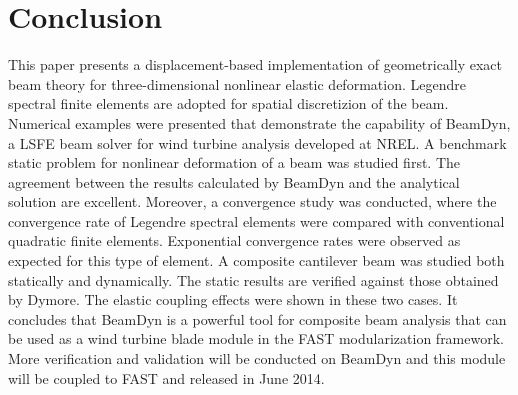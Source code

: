 \section{Conclusion}

This paper presents a displacement-based implementation of geometrically
exact beam theory for three-dimensional nonlinear elastic deformation. Legendre spectral finite elements are adopted for spatial discretizion of
the beam. Numerical examples were presented that demonstrate the capability
of BeamDyn, a LSFE beam solver for wind turbine analysis developed at NREL. A benchmark static problem for nonlinear deformation of a beam was studied first. The agreement between the results calculated by BeamDyn and the analytical solution are excellent. Moreover, a convergence study was conducted, where the convergence rate of Legendre spectral elements were compared with conventional quadratic finite elements. Exponential convergence rates were observed as expected for this type of element. A composite cantilever beam was studied both statically and dynamically. The static results are verified against those obtained by Dymore. The elastic coupling effects were shown in these two cases. It concludes that BeamDyn is a powerful tool for composite beam analysis that can be used as a wind turbine blade module in the FAST modularization framework. More verification and validation will be conducted on BeamDyn and this module will be coupled to FAST and released in June 2014. 

